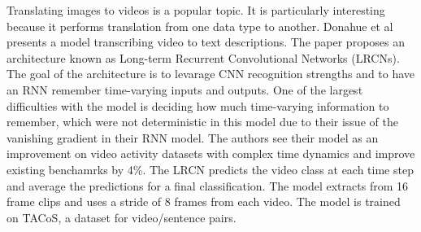 Translating images to videos is a popular topic.  It is particularly interesting because it performs translation from one data type to another.  Donahue et al presents a model transcribing video to text descriptions.  The paper proposes an architecture known as Long-term Recurrent Convolutional Networks (LRCNs).  The goal of the architecture is to levarage CNN recognition strengths and to have an RNN remember time-varying inputs and outputs. One of the largest difficulties with the model is deciding how much time-varying information to remember, which were not deterministic in this model due to their issue of the vanishing gradient in their RNN model.  The authors see their model as an improvement on video activity datasets with complex time dynamics and improve existing benchamrks by 4\%.  The LRCN predicts the video class at each time step and average the predictions for a final classification.  The model extracts from 16 frame clips and uses a stride of 8 frames from each video.  The model is trained on TACoS, a dataset for video/sentence pairs.


